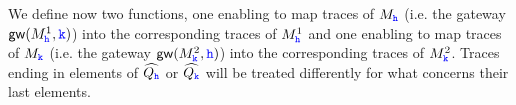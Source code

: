 We define now two functions, one enabling to map traces of ${M_\HH}$ (i.e. the gateway $\gateway{M^1_\HH, \KK}$)
  into the corresponding traces of ${M^1_\HH}$
and one enabling to map traces of ${M_\KK}$  (i.e. the gateway $\gateway{M^2_\KK, \HH}$) into the corresponding traces of ${M^2_\KK}$.
Traces ending in elements of $\widehat{Q_\HH}$ or $\widehat{Q_\KK}$ will be treated differently
for what concerns their last elements.


